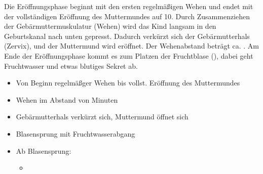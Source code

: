 {%
Die Eröffnungsphase beginnt mit den ersten regelmäßigen
Wehen und endet mit der vollständigen Eröffnung des
Muttermundes auf 10\CM*.
\cite{StriebelAnaesthesie2,BuehlingGynaekologie1,HaagGyn2007}
Durch Zusammenziehen der Gebärmuttermuskulatur
(Wehen) wird das Kind langsam in den Geburtskanal nach unten
gepresst. Dadurch verkürzt sich der Gebärmutterhals
(Zervix), und der Muttermund wird eröffnet. Der
Wehenabstand beträgt ca. \Min*.
Am Ende der Eröffnungsphase
kommt es zum Platzen der Fruchtblase (),
dabei geht Fruchtwasser und etwas blutiges Sekret ab.


}{%
\begin{itemize}
  \item Von Beginn regelmäßger Wehen bis vollst. Eröffnung
  des Muttermundes
  \item Wehen im Abstand von  Minuten
  \item Gebärmutterhals verkürzt sich, Muttermund öffnet sich
  \item Blasensprung mit Fruchtwasserabgang
  \item Ab Blasensprung: 
  \begin{itemize}
    \item {}
  \end{itemize}
\end{itemize}
}{}{}{}

